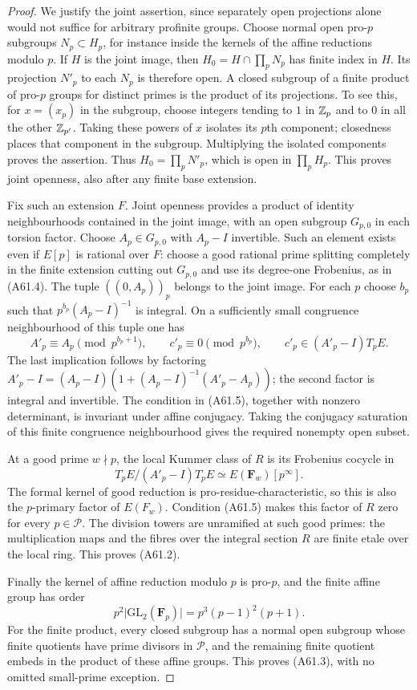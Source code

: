 \begin{proof}
We justify the joint assertion, since separately open projections
alone would not suffice for arbitrary profinite groups. Choose
normal open pro-$p$ subgroups $N_p\subset H_p$, for instance
inside the kernels of the affine reductions modulo $p$. If $H$
is the joint image, then
$H_0=H\cap\prod_pN_p$ has finite index in $H$. Its projection
$N'_p$ to each $N_p$ is therefore open. A closed subgroup of a
finite product of pro-$p$ groups for distinct primes is the product
of its projections. To see this, for $x=(x_p)$ in the subgroup,
choose integers tending to $1$ in $\mathbb Z_p$ and to $0$ in all the
other $\mathbb Z_{p'}$. Taking these powers of $x$ isolates its $p$th
component; closedness places that component in the subgroup.
Multiplying the isolated components proves the assertion.
Thus $H_0=\prod_pN'_p$, which is open in $\prod_pH_p$.
This proves joint openness, also after any finite base extension.

Fix such an extension $F$. Joint openness provides a product of
identity neighbourhoods contained in the joint image, with an
open subgroup $G_{p,0}$ in each torsion factor. Choose
$A_p\in G_{p,0}$ with $A_p-I$ invertible. Such an element exists
even if $E[p]$ is rational over $F$: choose a good rational prime
splitting completely in the finite extension cutting out
$G_{p,0}$ and use its degree-one Frobenius, as in (A61.4).
The tuple $((0,A_p))_p$ belongs to the joint image. For each $p$
choose $b_p$ such that
$p^{b_p}(A_p-I)^{-1}$ is integral. On a sufficiently small
congruence neighbourhood of this tuple one has
\[
 A'_p\equiv A_p\pmod{p^{b_p+1}},\qquad
 c'_p\equiv0\pmod{p^{b_p}},\qquad
 c'_p\in(A'_p-I)T_pE.
 \tag{A61.5}
\]
The last implication follows by factoring
$A'_p-I=(A_p-I)(1+(A_p-I)^{-1}(A'_p-A_p))$; the second factor
is integral and invertible. The condition in (A61.5), together
with nonzero determinant, is invariant under affine conjugacy.
Taking the conjugacy saturation of this finite congruence
neighbourhood gives the required nonempty open subset.

At a good prime $w\nmid p$, the local Kummer class of $R$ is its
Frobenius cocycle in
\[
 T_pE/(A'_p-I)T_pE
   \simeq E(\mathbf F_w)[p^\infty].
\]
The formal kernel of good reduction is pro-residue-characteristic,
so this is also the $p$-primary factor of $E(F_w)$. Condition
(A61.5) makes this factor of $R$ zero for every $p\in\mathcal P$.
The division towers are unramified at such good primes: the
multiplication maps and the fibres over the integral section $R$
are finite etale over the local ring. This proves (A61.2).

Finally the kernel of affine reduction modulo $p$ is pro-$p$,
and the finite affine group has order
\[
 p^2\lvert\mathrm{GL}_2(\mathbf F_p)\rvert
    =p^3(p-1)^2(p+1).
\]
For the finite product, every closed subgroup has a normal open
subgroup whose finite quotients have prime divisors in
$\mathcal P$, and the remaining finite quotient embeds in the
product of these affine groups. This proves (A61.3), with no
omitted small-prime exception.
\end{proof}

